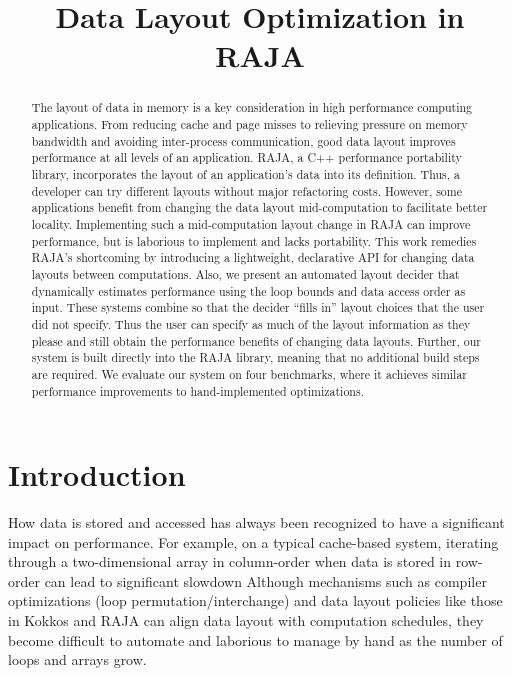 \documentclass[sigconf]{acmart}
\title{Data Layout Optimization in RAJA}
\begin{document}
\begin{abstract}

The layout of data in memory is a key consideration in high performance computing applications.
From reducing cache and page misses to relieving pressure on memory bandwidth and avoiding inter-process communication, good data layout improves performance at all levels of an application.
RAJA, a C++ performance portability library, incorporates the layout of an application's data into its definition.
Thus, a developer can try different layouts without major refactoring costs.
However, some applications benefit from changing the data layout mid-computation to facilitate better locality.
Implementing such a mid-computation layout change in RAJA can improve performance, but is laborious to implement and lacks portability.
This work remedies RAJA's shortcoming by introducing a lightweight, declarative API for changing data layouts between computations.
Also, we present an automated layout decider that dynamically estimates performance using the loop bounds and data access order as input. 
These systems combine so that the decider \enquote{fills in} layout choices
that the user did not specify.
Thus the user can specify as much of the layout information as they please and still obtain the performance benefits of changing data layouts.  
Further, our system is built directly into the RAJA library, meaning that no additional build steps are required.
We evaluate our system on four benchmarks, where it achieves similar performance improvements to hand-implemented optimizations.
\end{abstract}
\maketitle
\def\@textbottom{\vskip \z@ \@plus 1pt}




\section{Introduction}

How data is stored and accessed has always been recognized to have a significant impact on performance. 
For example, on a typical cache-based system, iterating through a two-dimensional array in column-order when data is 
stored in row-order can lead to significant slowdown 
Although mechanisms such as compiler optimizations (loop permutation/interchange) 
and data layout policies like those in Kokkos \cite{edwards2014kokkos} and RAJA \cite{hornung2014RAJA} can align data layout with computation schedules, they become difficult to automate and laborious to manage by hand as the number of loops and arrays grow.
\end{document}
